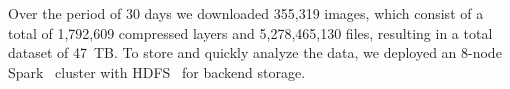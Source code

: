 %
%

Over the period of 30 days we downloaded 355,319 images,
which consist of a total of 1,792,609
compressed layers and 5,278,465,130 files, resulting in a total dataset
of 47~TB.
%
%
%
%
To store and quickly analyze the data, we deployed an 8-node Spark~\cite{spark}
cluster with HDFS~\cite{hdfs} for backend storage.
